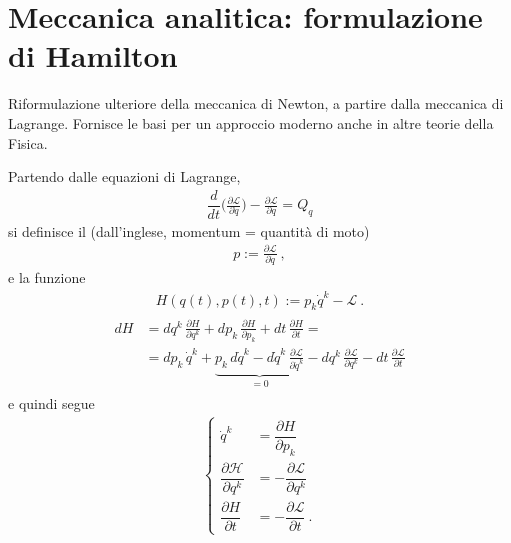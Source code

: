 \documentclass[letterpaper,10pt,english]{jupyterBook}
\begin{document}
\chapter{Meccanica analitica: formulazione di Hamilton}
\label{\detokenize{ch/hamilton:meccanica-analitica-formulazione-di-hamilton}}\label{\detokenize{ch/hamilton:classical-mechanics-hamilton}}\label{\detokenize{ch/hamilton::doc}}
\sphinxAtStartPar
Riformulazione ulteriore della meccanica di Newton, a partire dalla meccanica di Lagrange.
Fornisce le basi per un approccio moderno anche in altre teorie della Fisica. 

\sphinxAtStartPar
Partendo dalle equazioni di Lagrange,
\begin{equation*}
\begin{split}\dfrac{d}{dt}\Big( \frac{\partial \mathscr{L}}{\partial \dot{q}} \Big) - \frac{\partial \mathscr{L}}{\partial q} = Q_q\end{split}
\end{equation*}
\sphinxAtStartPar
si definisce il  (dall’inglese, momentum = quantità di moto)
\begin{equation*}
\begin{split}p := \frac{\partial \mathscr{L}}{\partial \dot{q}} \ ,\end{split}
\end{equation*}
\sphinxAtStartPar
e la funzione 
\begin{equation*}
\begin{split}H(q(t), p(t), t) := p_k \dot{q}^k - \mathscr{L} \ .\end{split}
\end{equation*}\begin{equation*}
\begin{split}\begin{aligned}
dH & = dq^k \, \frac{\partial H}{\partial q^k} + dp_k \, \frac{\partial H}{\partial p_k} + dt \,  \frac{\partial H}{\partial t} = \\
& = d p_k \, \dot{q}^k + \underbrace{ p_k \, d \dot{q}^k - d \dot{q}^k \, \frac{\partial \mathscr{L}}{\partial \dot{q}^k}}_{=0} - d q^k \, \frac{\partial \mathscr{L}}{\partial q^k} - dt \, \frac{\partial \mathscr{L}}{\partial t}
\end{aligned}\end{split}
\end{equation*}
\sphinxAtStartPar
e quindi segue
\begin{equation*}
\begin{split}\begin{cases}
 \dot{q}^k & = \dfrac{\partial H}{\partial p_k} \\
 \dfrac{\partial \mathscr{H}}{\partial q^k} & = - \dfrac{\partial \mathscr{L}}{\partial q^k} \\
 \dfrac{\partial H}{\partial t} & = - \dfrac{\partial\mathscr{L}}{\partial t} \ .
\end{cases}\end{split}
\end{equation*}
\end{document}
